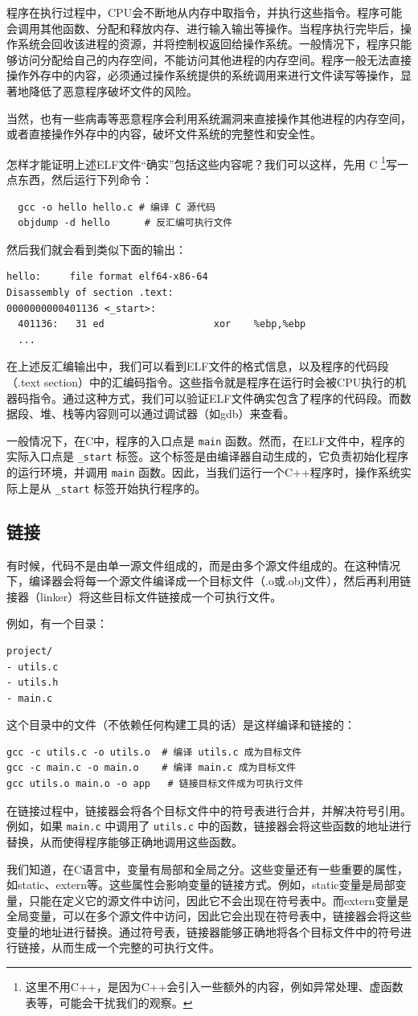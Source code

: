 程序在执行过程中，CPU会不断地从内存中取指令，并执行这些指令。程序可能会调用其他函数、分配和释放内存、进行输入输出等操作。当程序执行完毕后，操作系统会回收该进程的资源，并将控制权返回给操作系统。一般情况下，程序只能够访问分配给自己的内存空间，不能访问其他进程的内存空间。程序一般无法直接操作外存中的内容，必须通过操作系统提供的系统调用来进行文件读写等操作，显著地降低了恶意程序破坏文件的风险。

当然，也有一些病毒等恶意程序会利用系统漏洞来直接操作其他进程的内存空间，或者直接操作外存中的内容，破坏文件系统的完整性和安全性。

怎样才能证明上述ELF文件“确实”包括这些内容呢？我们可以这样，先用 C \footnote{这里不用C++，是因为C++会引入一些额外的内容，例如异常处理、虚函数表等，可能会干扰我们的观察。}写一点东西，然后运行下列命令：
\begin{verbatim}
  gcc -o hello hello.c # 编译 C 源代码
  objdump -d hello      # 反汇编可执行文件
\end{verbatim}
然后我们就会看到类似下面的输出：
\begin{verbatim}
hello:     file format elf64-x86-64
Disassembly of section .text:
0000000000401136 <_start>:
  401136:	31 ed                	xor    %ebp,%ebp
  ...
\end{verbatim}
在上述反汇编输出中，我们可以看到ELF文件的格式信息，以及程序的代码段（.text section）中的汇编码指令。这些指令就是程序在运行时会被CPU执行的机器码指令。通过这种方式，我们可以验证ELF文件确实包含了程序的代码段。而数据段、堆、栈等内容则可以通过调试器（如gdb）来查看。

一般情况下，在C中，程序的入口点是 \texttt{main} 函数。然而，在ELF文件中，程序的实际入口点是 \texttt{\_start} 标签。这个标签是由编译器自动生成的，它负责初始化程序的运行环境，并调用 \texttt{main} 函数。因此，当我们运行一个C++程序时，操作系统实际上是从 \texttt{\_start} 标签开始执行程序的。

\subsection{链接}

有时候，代码不是由单一源文件组成的，而是由多个源文件组成的。在这种情况下，编译器会将每一个源文件编译成一个目标文件（.o或.obj文件），然后再利用链接器（linker）将这些目标文件链接成一个可执行文件。

例如，有一个目录：
\begin{verbatim}
project/
- utils.c
- utils.h
- main.c
\end{verbatim}
这个目录中的文件（不依赖任何构建工具的话）是这样编译和链接的：
\begin{verbatim}
gcc -c utils.c -o utils.o  # 编译 utils.c 成为目标文件
gcc -c main.c -o main.o    # 编译 main.c 成为目标文件
gcc utils.o main.o -o app   # 链接目标文件成为可执行文件
\end{verbatim}
在链接过程中，链接器会将各个目标文件中的符号表进行合并，并解决符号引用。例如，如果 \texttt{main.c} 中调用了 \texttt{utils.c} 中的函数，链接器会将这些函数的地址进行替换，从而使得程序能够正确地调用这些函数。

我们知道，在C语言中，变量有局部和全局之分。这些变量还有一些重要的属性，如static、extern等。这些属性会影响变量的链接方式。例如，static变量是局部变量，只能在定义它的源文件中访问，因此它不会出现在符号表中。而extern变量是全局变量，可以在多个源文件中访问，因此它会出现在符号表中，链接器会将这些变量的地址进行替换。通过符号表，链接器能够正确地将各个目标文件中的符号进行链接，从而生成一个完整的可执行文件。
